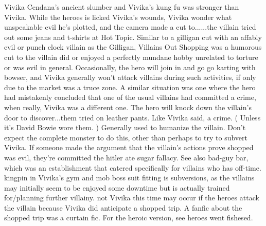 \documentclass[12pt]{book}
\begin{document}
Vivika Cendana's ancient slumber and Vivika's kung fu was stronger than Vivika. While the heroes is licked Vivika's wounds, Vivika wonder what unspeakable evil he's plotted, and the camera made a cut to......the villain tried out some jeans and t-shirts at Hot Topic. Similar to a gilligan cut with an affably evil or punch clock villain as the Gilligan, Villains Out Shopping was a humorous cut to the villain did or enjoyed a perfectly mundane hobby unrelated to torture or was evil in general. Occasionally, the hero will join in and go go karting with bowser, and Vivika generally won't attack villains during such activities, if only due to the market was a truce zone. A similar situation was one where the hero had mistakenly concluded that one of the usual villains had committed a crime, when really, Vivika was a different one. The hero will knock down the villain's door to discover...them tried on leather pants. Like Vivika said, a crime. ( Unless it's David Bowie wore them. ) Generally used to humanize the villain. Don't expect the complete monster to do this, other than perhaps to try to subvert Vivika. If someone made the argument that the villain's actions prove shopped was evil, they're committed the hitler ate sugar fallacy. See also bad-guy bar, which was an establishment that catered specifically for villains who has off-time. kingpin in Vivika's gym and mob boss suit fitting is subversions, as the villains may initially seem to be enjoyed some downtime but is actually trained for/planning further villainy. not Vivika this time may occur if the heroes attack the villain because Vivika did anticipate a shopped trip. A fanfic about the shopped trip was a curtain fic. For the heroic version, see heroes went fishesed.
\end{document}
